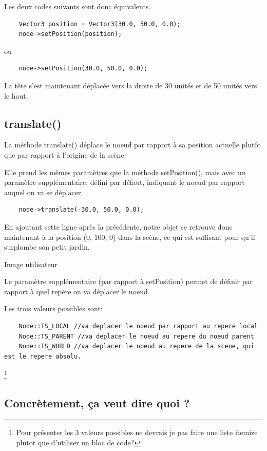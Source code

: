 Les deux codes suivants sont donc \'equivalents.
\begin{lstlisting}
	Vector3 position = Vector3(30.0, 50.0, 0.0);
	node->setPosition(position);
\end{lstlisting}

ou
\begin{lstlisting}
	node->setPosition(30.0, 50.0, 0.0);
\end{lstlisting}

La t\^ete s'est maintenant d\'eplac\'ee vers la droite de 30 unit\'es et de 50 unit\'es vers le haut.




\subsection{translate()}

La m\'ethode translate() d\'eplace le noeud par rapport \`{a} sa position actuelle plut\^ot que par rapport \`{a} l'origine de la sc\`ene.

Elle prend les m\^emes param\`etres que la m\'ethode setPosition(), mais avec un param\`etre suppl\'ementaire, d\'efini par d\'efaut, indiquant le noeud par rapport auquel on va se d\'eplacer.
\begin{lstlisting}
	node->translate(-30.0, 50.0, 0.0);
\end{lstlisting}

En ajoutant cette ligne apr\`es la pr\'ec\'edente, notre objet se retrouve donc maintenant \`{a} la position (0, 100, 0) dans la sc\`ene, ce qui est suffisant pour qu'il surplombe son petit jardin.

Image utilisateur

Le param\`etre suppl\'ementaire (par rapport \`{a} setPosition) permet de d\'efinir par rapport \`{a} quel rep\`ere on va d\'eplacer le noeud.

Les trois valeurs possibles sont:
\begin{lstlisting}
    Node::TS_LOCAL //va deplacer le noeud par rapport au repere local
    Node::TS_PARENT //va deplacer le noeud au repere du noeud parent
    Node::TS_WORLD //va deplacer le noeud au repere de la scene, qui est le repere absolu.
\end{lstlisting}\footnote{Pour présenter les 3 valeurs possibles ne devrais je pas faire une liste itemize plutot que d'utiliser un bloc de code?}



\subsection{Concr\`etement, \c{c}a veut dire quoi ?}

